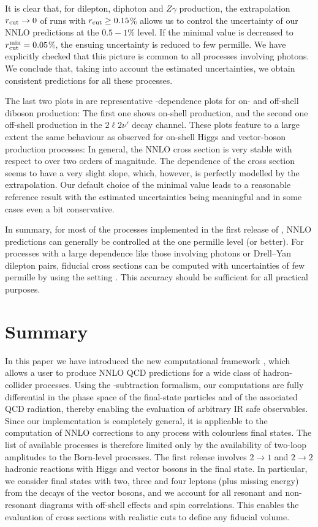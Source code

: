 \documentclass[english,11pt]{article}
\begin{document}
It is clear that, for dilepton, diphoton and $Z\gamma$ production,
the extrapolation  $r_{\mathrm{cut}}\rightarrow 0$ of runs with $r_{\mathrm{cut}}{}\ge 0.15$\% allows us to control the uncertainty of our 
NNLO predictions at the $0.5-1$\% level. If the minimal \rcut{} value is decreased to $r_{\mathrm{cut}}^\mathrm{min}{}= 0.05$\%,
the ensuing uncertainty is reduced to few permille.
We have explicitly checked that this picture is common to all processes involving photons. We conclude 
that, taking into account the estimated \rcut{} uncertainties, we obtain consistent predictions for all these 
processes.

The last two plots in  are representative \rcut{}-dependence plots for on- and off-shell 
diboson production: The first one shows on-shell \ww{} production, and the second one 
off-shell \zz{} production in the $2\ell 2\nu'$ decay channel. These plots
feature to a large extent the same behaviour as 
observed for on-shell Higgs and vector-boson production processes: In general, the NNLO cross section is very 
stable with respect to \rcut{} over two orders of magnitude. The \rcut{} dependence of the 
\ww{} cross section seems to have a very slight slope, which, however, is perfectly modelled by the extrapolation.
Our default choice of the minimal \rcut{} value leads to a reasonable reference result with the estimated uncertainties being meaningful 
and in some cases even a bit conservative. 

In summary, for most of the processes implemented in the first release of \Matrix{}, NNLO predictions
can generally be controlled at the one permille level (or better). For processes with a large \rcut{} dependence like those involving photons or Drell--Yan dilepton pairs, fiducial cross sections
can be computed with uncertainties of few permille by using the setting .
This accuracy should be sufficient for all practical purposes.


\section{Summary}
\label{sec:summary}
In this paper we have introduced the new computational framework \Matrix{}\cite{MATRIX}, 
which allows a user to produce NNLO QCD predictions for a wide class of 
hadron-collider processes. Using the \qt{}-subtraction formalism, our computations are 
fully differential in the phase space of the final-state particles and of the associated QCD radiation,
thereby enabling the evaluation 
of arbitrary IR safe observables. Since our 
implementation is completely general, it is applicable to the computation of NNLO 
corrections to any process with colourless final states. The list of available 
processes is therefore limited only by the availability of two-loop amplitudes 
to the Born-level processes. The first \Matrix{} release involves  $2\to 1$ and $2\to 2$ hadronic 
reactions with Higgs and vector bosons in the final state. 
In particular, we consider final states with two, three and four leptons (plus missing energy)
from the decays of the vector bosons, and we account for all resonant and non-resonant diagrams with off-shell 
effects and spin correlations. This enables the evaluation of cross 
sections with realistic cuts to define any fiducial volume.
\end{document}
